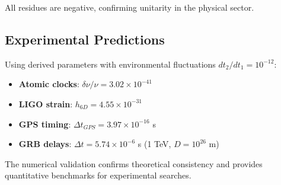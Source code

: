 \documentclass[12pt,a4paper]{article}
\begin{document}
All residues are negative, confirming unitarity in the physical sector.

\subsection{Experimental Predictions}

Using derived parameters with environmental fluctuations $dt_2/dt_1 = 10^{-12}$:

\begin{itemize}
\item \textbf{Atomic clocks}: $\delta\nu/\nu = 3.02 \times 10^{-41}$
\item \textbf{LIGO strain}: $h_{6D} = 4.55 \times 10^{-31}$  
\item \textbf{GPS timing}: $\Delta t_{GPS} = 3.97 \times 10^{-16}$ s
\item \textbf{GRB delays}: $\Delta t = 5.74 \times 10^{-6}$ s (1 TeV, $D = 10^{26}$ m)
\end{itemize}

The numerical validation confirms theoretical consistency and provides quantitative benchmarks for experimental searches.
\end{document}
